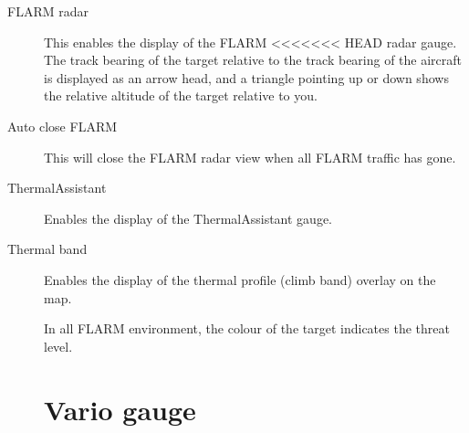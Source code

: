 \begin{description}
\item[FLARM radar]  \label{conf:flarmdisplay} This enables the display of the FLARM 
<<<<<<< HEAD
 radar gauge. The track bearing of the target relative to the track bearing of the 
 aircraft is displayed as an arrow head, and a triangle pointing up or down shows 
 the relative altitude of the target relative to you.
\item[Auto close FLARM]  This will close the FLARM radar view when all FLARM traffic has gone.
\item[ThermalAssistant] \label{conf:thermalassistant} Enables the display of the
ThermalAssistant gauge.
\item[Thermal band] \label{conf:thermalband} Enables the display of the
thermal profile (climb band) overlay on the map.

In all FLARM environment, the colour of the target indicates the threat level.


\clearpage
\section{Vario gauge}\label{sec:vario-gauge}


\end{description}
